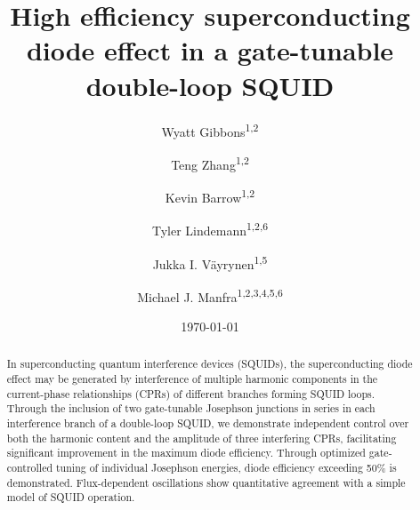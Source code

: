 \documentclass[%
 reprint,
 amsmath,amssymb,
 aps,
]{revtex4-2}
\begin{document}

\title{High efficiency superconducting diode effect in a gate-tunable double-loop SQUID}

\author{Wyatt Gibbons\textsuperscript{1,2}}
\author{Teng Zhang\textsuperscript{1,2}}
\author{Kevin Barrow\textsuperscript{1,2}}
\author{Tyler Lindemann\textsuperscript{1,2,6}}
\author{Jukka I. V\"ayrynen\textsuperscript{1,5}}
\author{Michael J. Manfra\textsuperscript{1,2,3,4,5,6}}
%

\date{\today}

\begin{abstract}
In superconducting quantum interference devices (SQUIDs), the superconducting diode effect may be generated by interference of multiple harmonic components in the current-phase relationships (CPRs) of different branches forming SQUID loops. Through the inclusion of two gate-tunable Josephson junctions in series in each interference branch of a double-loop SQUID, we demonstrate independent control over both the harmonic content and the amplitude of three interfering CPRs, facilitating significant improvement in the maximum diode efficiency. Through optimized gate-controlled tuning of individual Josephson energies, diode efficiency exceeding 50\% is demonstrated. Flux-dependent oscillations show quantitative agreement with a simple model of SQUID operation.
\end{abstract}

\maketitle
\end{document}
